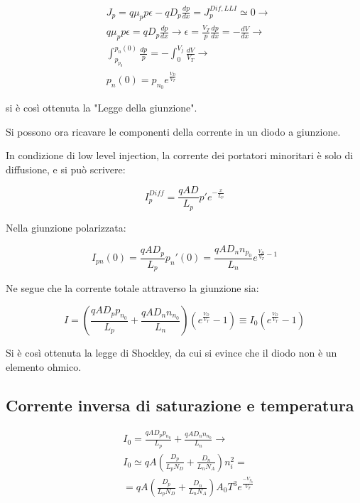\documentclass{article}
\begin{document}
\begin{equation}
    \begin{aligned}
         & J_p=q\mu_pp\epsilon-qD_p\frac{dp}{dx}=J_p^{Dif,LLI}\simeq 0 \rightarrow                                       \\
         & q\mu_pp\epsilon=qD_p\frac{dp}{dx} \rightarrow \epsilon= \frac{V_T}{p}\frac{dp}{dx}=-\frac{dV}{dx} \rightarrow \\
         & \int_{p_{p_0}}^{p_n(0)}\frac{dp}{p}=-\int_{0}^{V_j}\frac{dV}{V_T} \rightarrow                                 \\
         & p_n(0)=p_{n_0}e^{\frac{V_D}{V_T}}
    \end{aligned}
\end{equation}

si è così ottenuta la "Legge della giunzione".

Si possono ora ricavare le componenti della corrente in un diodo a giunzione.

In condizione di low level injection, la corrente dei portatori minoritari è solo di diffusione, e si può scrivere:

\begin{equation}
    I_p^{Diff}=\frac{qAD}{L_p}p'e^{-\frac{x}{L_p}}
\end{equation}

Nella giunzione polarizzata:

\begin{equation}
    I_{pn}(0)=\frac{qAD_p}{L_p}p_n'(0)=\frac{qAD_nn_{p_0}}{L_n}e^{\frac{V_D}{V_T}-1}
\end{equation}

Ne segue che la corrente totale attraverso la giunzione sia:

\begin{equation}
    I=(\frac{qAD_pp_{n_0}}{L_p}+\frac{qAD_nn_{n_0}}{L_n})(e^{\frac{V_D}{V_T}}-1)\equiv I_0(e^{\frac{V_D}{V_T}}-1)
\end{equation}

Si è così ottenuta la legge di Shockley, da cui si evince che il diodo non è un elemento ohmico.


\subsection{Corrente inversa di saturazione e temperatura}

\begin{equation}
    \begin{aligned}
         & I_0=\frac{qAD_pp_{n_0}}{L_p}+\frac{qAD_nn_{n_0}}{L_n} \rightarrow                    \\
         & I_0\simeq qA \left(\frac{D_p}{L_pN_D}+\frac{D_n}{L_nN_A}\right)n_i^2=                \\
         & =qA \left(\frac{D_p}{L_pN_D}+\frac{D_n}{L_nN_A}\right)A_0T^3e^{\frac{-V_{g_0}}{V_T}}
    \end{aligned}
\end{equation}
\end{document}
